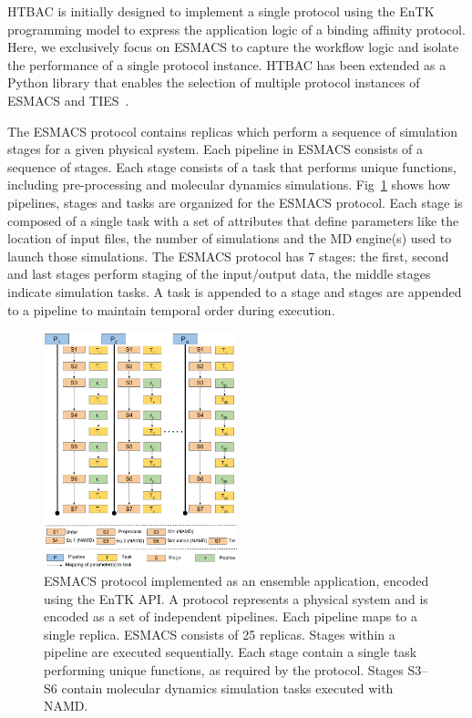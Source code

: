 HTBAC is initially designed to implement a single protocol using the EnTK
programming model to express the application logic of a binding affinity
protocol. Here, we exclusively focus on ESMACS to capture the workflow logic
and isolate the performance of a single protocol instance. HTBAC has been
extended as a Python library that enables the selection of multiple protocol
instances of ESMACS and TIES~\cite{dakka}.

The ESMACS protocol contains replicas 
 which
perform a sequence of simulation stages for a given physical system. Each
pipeline in ESMACS consists of a sequence
of stages. Each stage consists of a task that performs unique functions,
including pre-processing and molecular dynamics simulations.
Fig~\ref{figure:HTBAC} shows how pipelines, stages and tasks are organized for
the ESMACS protocol. Each stage is composed of a single task with a set of
attributes that define parameters like the location of input files, the number
of simulations and the MD engine(s) used to launch those simulations. The
ESMACS protocol has 7 stages: the first, second and last stages perform
staging of the input/output data, the middle stages indicate simulation tasks.
A task is appended to a stage and stages are appended to a pipeline to
maintain temporal order during execution.

\begin{figure}
\centering
  \includegraphics[width=0.5\textwidth]{FIGURES/HTBAC_Workflow_ESMACS.pdf}
  \caption{ESMACS protocol implemented as an ensemble application, encoded
  using the EnTK API\@. A protocol represents a physical system and is
  encoded as a set of independent pipelines. Each pipeline maps to a single
  replica. ESMACS consists of 25 replicas. Stages within a pipeline are
  executed sequentially. Each stage contain a single task performing unique
  functions, as required by the protocol. Stages S3--S6 contain molecular
  dynamics simulation tasks executed with NAMD\@.}\label{figure:HTBAC}
\end{figure}

